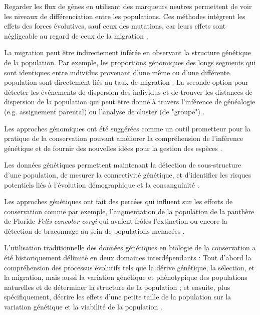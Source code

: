 \documentclass[a4paper,11pt,twoside]{report}
\begin{document}
Regarder les flux de gènes en utilisant des marqueurs neutres permettent de voir les niveaux de différenciation entre les populations. Ces méthodes intègrent les effets des forces évolutives, sauf ceux des mutations, car leurs effets sont négligeable au regard de ceux de la migration \citep{Gagnaire:2015aa}.

La migration peut être indirectement inférée en observant la structure génétique de la population. Par exemple, les proportions génomiques des longs segments qui sont identiques entre individus provenant d'une même ou d'une différente population sont directement liés au taux de migration \citep{palamara2013inference}.  La seconde option pour détecter les événements de dispersion des individus et de trouver les distances de dispersion de la population qui peut être donné à travers l'inférence de généalogie (e.g. assignement parental) ou l'analyse de cluster (de "groupe") \citep{Gagnaire:2015aa}.

Les approches génomiques ont été suggérées comme un outil prometteur pour la pratique de la conservation pouvant améliorer la compréhension de l'inférence génétique et de fournir des nouvelles idées pour la gestion des espèces \cite{shafer2015genomics}\cite{garner2015genomics}.

Les données génétiques permettent maintenant la détection de sous-structure d'une population, de mesurer la connectivité génétique, et d'identifier les risques potentiels liés à l'évolution démographique et la consanguinité \cite{frankham1995conservation}. 

Les approches génétiques ont fait des percées qui influent sur les efforts de conservation comme par exemple, l'augmentation de la population de la panthère de Floride \textit{Felis concolor coryi} qui avaient frôlés l'extinction \cite{seal1994plan} ou encore la détection de braconnage au sein de populations menacées \cite{manel2002detecting}.

L'utilisation traditionnelle des données génétiques en biologie de la conservation a été historiquement délimité en deux domaines interdépendants \cite{frankham2002introduction}: Tout d'abord la compréhension des processus évolutifs tels que la dérive génétique, la sélection, et la migration, mais aussi la variation génétique et phénotypique des populations naturelles et de déterminer la structure de la population \cite{frankham2002introduction}; et ensuite, plus spécifiquement, décrire les effets d'une petite taille de la population sur la variation génétique et la viabilité de la population \cite{frankham2002introduction}\cite{shafer2015genomics}. 
\end{document}

